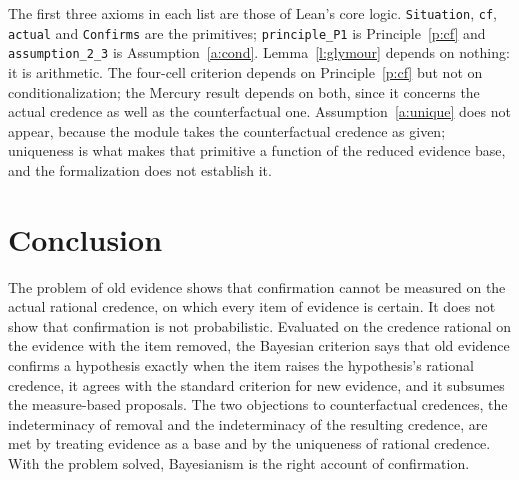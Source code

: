 \documentclass{situationist-preprint}
\begin{document}
The first three axioms in each list are those of Lean's core logic. \texttt{Situation}, \texttt{cf}, \texttt{actual} and \texttt{Confirms} are the primitives; \texttt{principle\_P1} is Principle~\ref{p:cf} and \texttt{assumption\_2\_3} is Assumption~\ref{a:cond}. Lemma~\ref{l:glymour} depends on nothing: it is arithmetic. The four-cell criterion depends on Principle~\ref{p:cf} but not on conditionalization; the Mercury result depends on both, since it concerns the actual credence as well as the counterfactual one. Assumption~\ref{a:unique} does not appear, because the module takes the counterfactual credence as given; uniqueness is what makes that primitive a function of the reduced evidence base, and the formalization does not establish it.

\section{Conclusion}\label{s:conclusion}

The problem of old evidence shows that confirmation cannot be measured on the actual rational credence, on which every item of evidence is certain. It does not show that confirmation is not probabilistic. Evaluated on the credence rational on the evidence with the item removed, the Bayesian criterion says that old evidence confirms a hypothesis exactly when the item raises the hypothesis's rational credence, it agrees with the standard criterion for new evidence, and it subsumes the measure-based proposals. The two objections to counterfactual credences, the indeterminacy of removal and the indeterminacy of the resulting credence, are met by treating evidence as a base and by the uniqueness of rational credence. With the problem solved, Bayesianism is the right account of confirmation.
\end{document}
